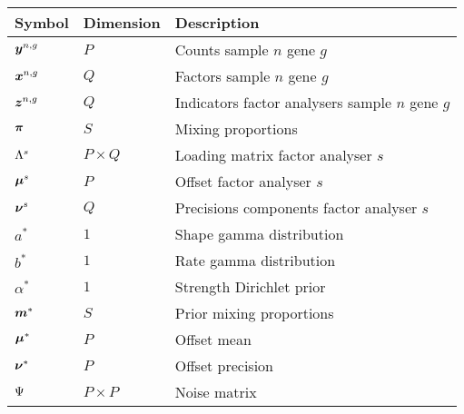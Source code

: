 \documentclass[a4paper]{article}
\begin{document}
\begin{table}[h]
  \begin{center}
  \begin{tabular}{lll}
    \toprule
    Symbol & Dimension & Description \\ \hline
    $\boldsymbol{y}^{n,g}$ & $P$ & Counts sample $n$ gene $g$ \\
    $\boldsymbol{x}^{n,g}$ & $Q$ & Factors sample $n$ gene $g$ \\
    $\boldsymbol{z}^{n,g}$ & $Q$ & Indicators factor analysers sample $n$ gene $g$ \\
    $\boldsymbol{\pi}$ & $S$ & Mixing proportions \\
    $\Lambda^s$ & $P \times Q$ & Loading matrix factor analyser $s$ \\
    $\boldsymbol{\mu}^s$ & $P$ & Offset factor analyser $s$ \\
    $\boldsymbol{\nu}^s$ & $Q$ & Precisions components factor analyser $s$ \\ \hline
    $a^*$ & $1$ & Shape gamma distribution \\
    $b^*$ & $1$ & Rate gamma distribution \\
    $\alpha^*$ & $1$ & Strength Dirichlet prior \\
    $\boldsymbol{m}^*$ & $S$ & Prior mixing proportions \\
    $\boldsymbol{\mu}^*$ & $P$ & Offset mean \\
    $\boldsymbol{\nu}^*$ & $P$ & Offset precision \\
    $\Psi$ & $P \times P$ & Noise matrix \\
    \bottomrule
  \end{tabular}
\end{center}
\end{table}
\end{document}
